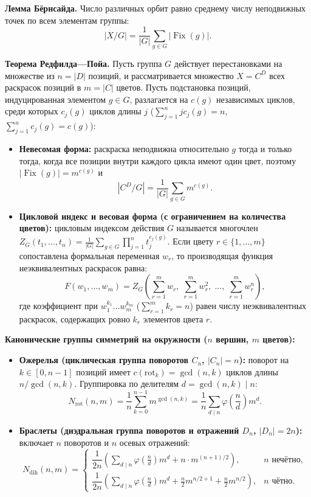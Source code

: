 \documentclass[10pt,a4paper]{article}
\DeclareMathOperator{\Fix}{Fix}
\begin{document}
\textbf{Лемма Бёрнсайда.} Число различных орбит равно среднему числу неподвижных точек по всем элементам группы:
\[
  |X / G| = \frac{1}{|G|} \sum_{g \in G} |\Fix(g)|.
\]

\textbf{Теорема Редфилда—Пойа.} Пусть группа $G$ действует перестановками на множестве из $n = |D|$ позиций, и рассматривается множество $X = C^D$ всех раскрасок позиций в $m = |C|$ цветов. Пусть подстановка позиций, индуцированная элементом $g \in G$, разлагается на $c(g)$ независимых циклов, среди которых $c_j(g)$ циклов длины $j$ ($\sum_{j=1}^n j c_j(g) = n$, $\sum_{j=1}^n c_j(g) = c(g)$):
\begin{itemize}
  \item \textbf{Невесомая форма:} раскраска неподвижна относительно $g$ тогда и только тогда, когда все позиции внутри каждого цикла имеют один цвет, поэтому $|\Fix(g)| = m^{c(g)}$ и
  \[
    |C^D / G| = \frac{1}{|G|} \sum_{g \in G} m^{c(g)}.
  \]
  \item \textbf{Цикловой индекс и весовая форма (с ограничением на количества цветов):} цикловым индексом действия $G$ называется многочлен $Z_G(t_1, \dots, t_n) = \frac{1}{|G|} \sum_{g \in G} \prod_{j=1}^n t_j^{c_j(g)}$. Если цвету $r \in \{1, \dots, m\}$ сопоставлена формальная переменная $w_r$, то производящая функция неэквивалентных раскрасок равна:
  \[
    F(w_1, \dots, w_m) = Z_G\!\left(\sum_{r=1}^{m} w_r,\; \sum_{r=1}^{m} w_r^2,\; \dots,\; \sum_{r=1}^{m} w_r^n\right),
  \]
  где коэффициент при $w_1^{k_1} \dots w_m^{k_m}$ ($\sum_{r=1}^m k_r = n$) равен числу неэквивалентных раскрасок, содержащих ровно $k_r$ элементов цвета $r$.
\end{itemize}

\textbf{Канонические группы симметрий на окружности ($n$ вершин, $m$ цветов):}
\begin{itemize}
  \item \textbf{Ожерелья (циклическая группа поворотов $C_n$, $|C_n| = n$):} поворот на $k \in [0, n - 1]$ позиций имеет $c(\mathrm{rot}_k) = \gcd(n, k)$ циклов длины $n / \gcd(n, k)$. Группировка по делителям $d = \gcd(n, k) \mid n$:
  \[
    N_{\mathrm{rot}}(n, m) = \frac{1}{n} \sum_{k=0}^{n-1} m^{\gcd(n, k)} = \frac{1}{n} \sum_{d \mid n} \varphi\!\left(\frac{n}{d}\right) m^d.
  \]
  \item \textbf{Браслеты (диэдральная группа поворотов и отражений $D_n$, $|D_n| = 2n$):} включает $n$ поворотов и $n$ осевых отражений:
  \[
    N_{\mathrm{dih}}(n, m) =
    \begin{cases}
      \dfrac{1}{2n}\!\left(\displaystyle\sum_{d \mid n} \varphi\!\left(\frac{n}{d}\right) m^d + n \cdot m^{(n + 1)/2}\right), & n \text{ нечётно}, \\[10pt]
      \dfrac{1}{2n}\!\left(\displaystyle\sum_{d \mid n} \varphi\!\left(\frac{n}{d}\right) m^d + \frac{n}{2} m^{n/2 + 1} + \frac{n}{2} m^{n/2}\right), & n \text{ чётно.}
    \end{cases}
  \]
\end{itemize}
\end{document}
